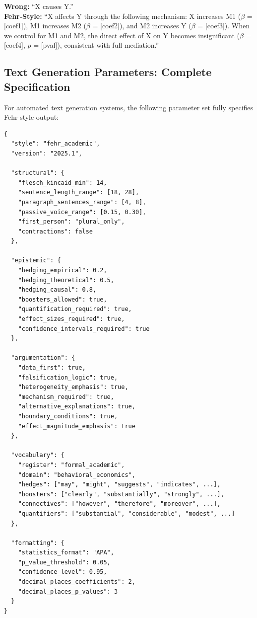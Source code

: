 \begin{tcolorbox}[colback=gray!5!white, colframe=gray!75!black]
\textbf{Wrong:} ``X causes Y.'' \\[0.5em]
\textbf{Fehr-Style:} ``X affects Y through the following mechanism:
X increases M1 ($\beta$ = [coef1]), M1 increases M2 ($\beta$ = [coef2]),
and M2 increases Y ($\beta$ = [coef3]). When we control for M1 and M2,
the direct effect of X on Y becomes insignificant ($\beta$ = [coef4],
$p$ = [pval]), consistent with full mediation.''
\end{tcolorbox}

\subsection{Text Generation Parameters: Complete Specification}

For automated text generation systems, the following parameter set
fully specifies Fehr-style output:

\begin{verbatim}
{
  "style": "fehr_academic",
  "version": "2025.1",

  "structural": {
    "flesch_kincaid_min": 14,
    "sentence_length_range": [18, 28],
    "paragraph_sentences_range": [4, 8],
    "passive_voice_range": [0.15, 0.30],
    "first_person": "plural_only",
    "contractions": false
  },

  "epistemic": {
    "hedging_empirical": 0.2,
    "hedging_theoretical": 0.5,
    "hedging_causal": 0.8,
    "boosters_allowed": true,
    "quantification_required": true,
    "effect_sizes_required": true,
    "confidence_intervals_required": true
  },

  "argumentation": {
    "data_first": true,
    "falsification_logic": true,
    "heterogeneity_emphasis": true,
    "mechanism_required": true,
    "alternative_explanations": true,
    "boundary_conditions": true,
    "effect_magnitude_emphasis": true
  },

  "vocabulary": {
    "register": "formal_academic",
    "domain": "behavioral_economics",
    "hedges": ["may", "might", "suggests", "indicates", ...],
    "boosters": ["clearly", "substantially", "strongly", ...],
    "connectives": ["however", "therefore", "moreover", ...],
    "quantifiers": ["substantial", "considerable", "modest", ...]
  },

  "formatting": {
    "statistics_format": "APA",
    "p_value_threshold": 0.05,
    "confidence_level": 0.95,
    "decimal_places_coefficients": 2,
    "decimal_places_p_values": 3
  }
}
\end{verbatim}

